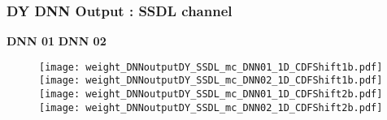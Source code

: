 \documentclass[9pt]{beamer}
\begin{document}
\begin{frame}
	\frametitle{DY DNN Output : SSDL channel}
	\hspace{2.0cm} \textbf{DNN 01} \hspace{4cm} \textbf{DNN 02} 
	\begin{figure}
		\texttt{[image: weight\_DNNoutputDY\_SSDL\_mc\_DNN01\_1D\_CDFShift1b.pdf]}
		\texttt{[image: weight\_DNNoutputDY\_SSDL\_mc\_DNN02\_1D\_CDFShift1b.pdf]}\\
		\texttt{[image: weight\_DNNoutputDY\_SSDL\_mc\_DNN01\_1D\_CDFShift2b.pdf]}
		\texttt{[image: weight\_DNNoutputDY\_SSDL\_mc\_DNN02\_1D\_CDFShift2b.pdf]}
	\end{figure}
\end{frame}
\end{document}
